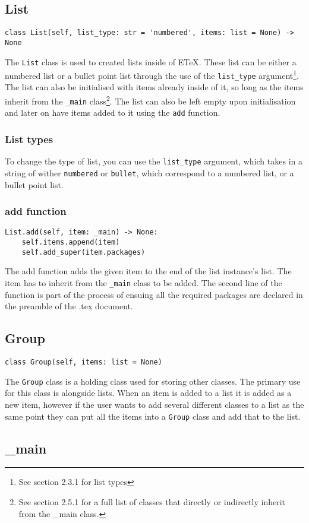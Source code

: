 \documentclass{article}
\begin{document}
\subsection[List]{List}
\lstset{language=Python}
\begin{lstlisting}
class List(self, list_type: str = 'numbered', items: list = None) -> None
\end{lstlisting}
The \verb|List| class is used to created lists inside of ETeX. These list can be either a numbered list or a bullet point list through the use of the \verb|list_type| argument\footnote{See section 2.3.1 for list types}. The list can also be initialised with items already inside of it, so long as the items inherit from the \verb|_main| class\footnote{See section 2.5.1 for a full list of classes that directly or indirectly inherit from the \_main class.}. The list can also be left empty upon initialisation and later on have items added to it using the \verb|add| function.\subsubsection[List types]{List types}
To change the type of list, you can use the \verb|list_type| argument, which takes in a string of wither \verb|numbered| or \verb|bullet|, which correspond to a numbered list, or a bullet point list.\subsubsection[add function]{add function}
\lstset{language=Python}
\begin{lstlisting}
List.add(self, item: _main) -> None:
	self.items.append(item)
	self.add_super(item.packages)
\end{lstlisting}
The add function adds the given item to the end of the list instance's list. The item has to inherit from the \verb|_main| class to be added. The second line of the function is part of the process of ensuing all the required packages are declared in the preamble of the .tex document.\subsection[Group]{Group}
\lstset{language=Python}
\begin{lstlisting}
class Group(self, items: list = None)
\end{lstlisting}
The \verb|Group| class is a holding class used for storing other classes. The primary use for this class is alongside lists. When an item is added to a list it is added as a new item, however if the user wants to add several different classes to a list as the same point they can put all the items into a \verb|Group| class and add that to the list.\subsection[\_main]{\_main}
\end{document}
